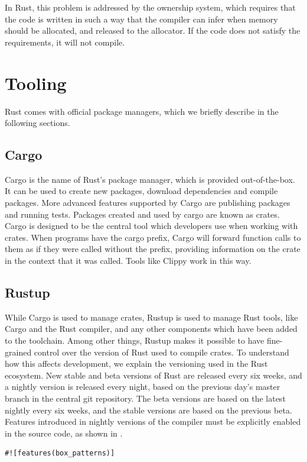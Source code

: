 \documentclass[paper=a4,%
  twoside,%
  BCOR4mm,%
  abstract=true,%
  toc=bibliography,%
  chapterprefix=true,%
  toc=bibliographynumbered,%
  open=right,%
  english,%
  pagesize=pdftex]{scrreprt}
\begin{document}
In Rust, this problem is addressed by the ownership system, which requires that the code is written in such a way that the compiler can infer when memory should be allocated, and released to the allocator. If the code does not satisfy the requirements, it will not compile.

\section{Tooling}
Rust comes with official package managers, which we briefly describe in the following sections.

\subsection{Cargo}
Cargo is the name of Rust's package manager, which is provided out-of-the-box. It can be used to create new packages, download dependencies and compile packages. More advanced features supported by Cargo are publishing packages and running tests. Packages created and used by cargo are known as crates. Cargo is designed to be the central tool which developers use when working with crates. When programs have the cargo prefix, Cargo will forward function calls to them as if they were called without the prefix, providing information on the crate in the context that it was called. Tools like Clippy work in this way.

\subsection{Rustup}
While Cargo is used to manage crates, Rustup is used to manage Rust tools, like Cargo and the Rust compiler, and any other components which have been added to the toolchain. Among other things, Rustup makes it possible to have fine-grained control over the version of Rust used to compile crates. To understand how this affects development, we explain the versioning used in the Rust ecosystem. New stable and beta versions of Rust are released every six weeks, and a nightly version is released every night, based on the previous day's master branch in the central git repository. The beta versions are based on the latest nightly every six weeks, and the stable versions are based on the previous beta.
Features introduced in nightly versions of the compiler must be explicitly enabled in the source code, as shown in .

\begin{lstlisting}[style=boxed, caption=Enabling features in Rust, label=lst:example-enable-feature]
#![features(box_patterns)]
\end{lstlisting}
\end{document}
